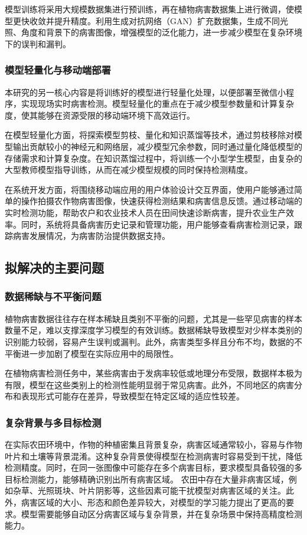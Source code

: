 模型训练将采用大规模数据集进行预训练，再在植物病害数据集上进行微调，使模型更快收敛并提升精度。利用生成对抗网络（GAN）扩充数据集，生成不同光照、角度和背景下的病害图像，增强模型的泛化能力，进一步减少模型在复杂环境下的误判和漏判。

\subsubsection{模型轻量化与移动端部署}
本研究的另一核心内容是将训练好的模型进行轻量化处理，以便部署至微信小程序，实现现场实时病害检测。模型轻量化的重点在于减少模型参数量和计算复杂度，使其能够在资源受限的移动端环境下高效运行。

在模型轻量化方面，将探索模型剪枝、量化和知识蒸馏等技术，通过剪枝移除对模型输出贡献较小的神经元和网络层，减少模型冗余参数，同时通过量化降低模型的存储需求和计算复杂度。在知识蒸馏过程中，将训练一个小型学生模型，由复杂的大型教师模型指导训练，从而在减少模型规模的同时保持检测精度。

在系统开发方面，将围绕移动端应用的用户体验设计交互界面，使用户能够通过简单的操作拍摄农作物病害图像，快速获得检测结果和病害信息反馈。通过移动端的实时检测功能，帮助农户和农业技术人员在田间快速诊断病害，提升农业生产效率。同时，系统将具备病害历史记录和管理功能，用户能够查看病害检测记录，跟踪病害发展情况，为病害防治提供数据支持。

\subsection{拟解决的主要问题}
\subsubsection{数据稀缺与不平衡问题}
植物病害数据往往存在样本稀缺且类别不平衡的问题，尤其是一些罕见病害的样本数量不足，难以支撑深度学习模型的有效训练。数据稀缺导致模型对少样本类别的识别能力较弱，容易产生误判或漏判。此外，病害类型多样且分布不均，数据的不平衡进一步加剧了模型在实际应用中的局限性。

在植物病害检测任务中，某些病害由于发病率较低或地理分布受限，数据样本极为有限，模型在这些类别上的检测性能明显弱于常见病害。此外，不同地区的病害分布和表现形式可能存在差异，导致模型在特定区域的适应性较差。

\subsubsection{复杂背景与多目标检测}
在实际农田环境中，作物的种植密集且背景复杂，病害区域通常较小，容易与作物叶片和土壤等背景混淆。这种复杂背景使得模型在检测病害时容易受到干扰，降低检测精度。同时，在同一张图像中可能存在多个病害目标，要求模型具备较强的多目标检测能力，能够精确识别出所有病害区域。
农田中存在大量非病害区域，例如杂草、光照斑块、叶片阴影等，这些因素可能干扰模型对病害区域的关注。此外，病害区域的大小、形态和颜色差异较大，对模型的学习能力提出了更高的要求。模型需要能够自动区分病害区域与复杂背景，并在复杂场景中保持高精度检测能力。


